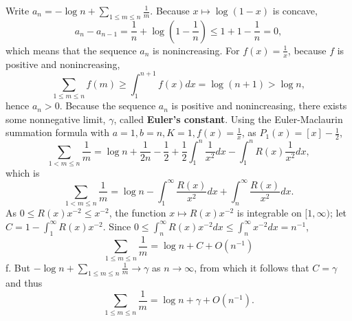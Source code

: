 \documentclass{article}
\begin{document}
Write $a_n  = - \log n+ \sum_{1 \leq m \leq n} \frac{1}{m}$. Because $x \mapsto \log(1-x)$ is concave,
\[
a_n - a_{n-1} = \frac{1}{n} + \log\left(1-\frac{1}{n} \right) \leq 1 + 1 - \frac{1}{n}=0,
\] 
which means that the sequence $a_n$ is nonincreasing. For $f(x)=\frac{1}{x}$, because
$f$ is positive and nonincreasing,
\[
\sum_{1 \leq m \leq n} f(m) \geq \int_1^{n+1} f(x) dx = \log(n+1) > \log n,
\]
hence $a_n>0$. Because the sequence $a_n$ is positive and nonincreasing, there exists some nonnegative limit,
$\gamma$, called \textbf{Euler's constant}. 
Using the Euler-Maclaurin summation formula with $a=1, b=n, K=1, f(x)=\frac{1}{x}$, as $P_1(x) = [x]-\frac{1}{2}$,
\[
\sum_{1 < m \leq n} \frac{1}{m} = \log n + \frac{1}{2n} - \frac{1}{2} + \frac{1}{2} \int_1^n \frac{1}{x^2} dx - \int_1^n R(x) \frac{1}{x^2} dx,
\]
which is
\[
\sum_{1<m \leq n} \frac{1}{m} = \log n - \int_1^\infty \frac{R(x)}{x^2} dx + \int_n^\infty \frac{R(x)}{x^2} dx.
\]
As $0 \leq R(x) x^{-2} \leq x^{-2}$, the function $x \mapsto R(x)x^{-2}$ is integrable
on $[1,\infty)$; let $C=1-\int_1^\infty R(x)x^{-2}$.
Since $0 \leq \int_n^\infty R(x)x^{-2} dx \leq \int_n^\infty x^{-2} dx = n^{-1}$, 
\[
\sum_{1 \leq m \leq n} \frac{1}{m} = \log n + C + O(n^{-1})
\]
f. But $-\log n + \sum_{1 \leq m \leq n} \frac{1}{m} \to \gamma$ as $n \to \infty$, from which it follows that
$C=\gamma$ and thus
\[
\sum_{1 \leq m \leq n} \frac{1}{m} = \log n + \gamma + O(n^{-1}).
\]
\end{document}

